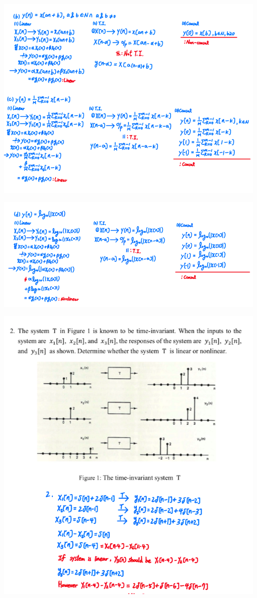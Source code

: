 \documentclass[a4paper]{article}
\begin{document}
	\begin{center}
		\includegraphics[width=1\linewidth]{screenshot010}
	\end{center}
	\begin{center}
		\includegraphics[width=1\linewidth]{screenshot011}
	\end{center}
	\begin{center}
		\includegraphics[width=1\linewidth]{screenshot012}
	\end{center}
	
\end{document}
